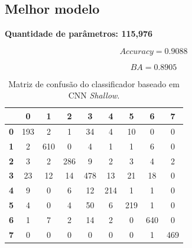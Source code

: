 \subsection{Melhor modelo}

\textbf{Quantidade de parâmetros: 115,976}

\begin{equation}\label{eq:accuracy_CNN_shallow}
	Accuracy = 0.9088
\end{equation}

\begin{equation}\label{eq:BA_CNN_shallow}
	BA = 0.8905
\end{equation}

\begin{table}[H]
	\centering
	\begin{tabular}{c||c|c|c|c|c|c|c|c|}
		\cline{2-9}
		\textbf{}                        & \textbf{0} & \textbf{1} & \textbf{2} & \textbf{3} & \textbf{4} & \textbf{5} & \textbf{6} & \textbf{7} \\ \hline \hline
		\multicolumn{1}{|c||}{\textbf{0}} & 193        & 2          & 1          & 34         & 4          & 10         & 0          & 0          \\ \hline
		\multicolumn{1}{|c||}{\textbf{1}} & 2          & 610        & 0          & 4          & 1          & 1          & 6          & 0          \\ \hline
		\multicolumn{1}{|c||}{\textbf{2}} & 3          & 2          & 286        & 9          & 2          & 3          & 4          & 2          \\ \hline
		\multicolumn{1}{|c||}{\textbf{3}} & 23         & 12         & 14         & 478        & 13         & 21         & 18         & 0          \\ \hline
		\multicolumn{1}{|c||}{\textbf{4}} & 9          & 0          & 6          & 12         & 214        & 1          & 1          & 0          \\ \hline
		\multicolumn{1}{|c||}{\textbf{5}}          & 4          & 0          & 4          & 50         & 6          & 219        & 1          & 0          \\ \hline
		\multicolumn{1}{|c||}{\textbf{6}} & 1          & 7          & 2          & 14         & 2          & 0          & 640        & 0          \\ \hline
		\multicolumn{1}{|c||}{\textbf{7}} & 0          & 0          & 0          & 0          & 0          & 0          & 1          & 469        \\ \hline
	\end{tabular}
	\caption{Matriz de confusão do classificador baseado em CNN \textit{Shallow}.}
	\label{tab:mc_CNN_shallow}
\end{table}

